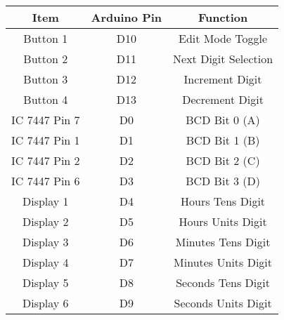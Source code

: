 \centering
\begin{tabular}{|c|c|c|}
\hline
Item & Arduino Pin & Function\\
\hline
Button 1 & D10 & Edit Mode Toggle\\
\hline
Button 2 & D11 & Next Digit Selection\\
\hline
Button 3 & D12  & Increment Digit\\
\hline
Button 4 & D13  & Decrement Digit\\
\hline
IC 7447 Pin 7 & D0 & BCD Bit 0 (A)\\
\hline
IC 7447 Pin 1 & D1 & BCD Bit 1 (B)\\
\hline
IC 7447 Pin 2 & D2 & BCD Bit 2 (C)\\
\hline
IC 7447 Pin 6 & D3 & BCD Bit 3 (D)\\
\hline
Display 1  & D4 & Hours Tens Digit\\
\hline
Display 2  & D5 & Hours Units Digit\\
\hline
Display 3  & D6 & Minutes Tens Digit\\
\hline
Display 4  & D7 & Minutes Units Digit\\
\hline
Display 5 & D8 & Seconds Tens Digit\\
\hline
Display 6  & D9 & Seconds Units Digit\\
\hline
\end{tabular}\\
